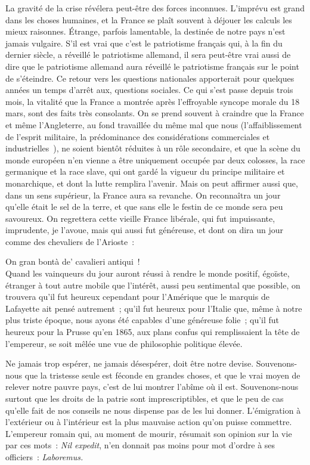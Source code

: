 \documentclass[french,twoside]{book} %
\begin{document}
La gravité de la crise révélera peut-être des forces inconnues. L’imprévu est grand dans les choses humaines, et la France se plaît souvent à déjouer les calculs les mieux raisonnes. Étrange, parfois lamentable, la destinée de notre pays n’est jamais vulgaire. S’il est vrai que c’est le patriotisme français qui, à la fin du dernier siècle, a réveillé le patriotisme allemand, il sera peut-être vrai aussi de dire que le patriotisme allemand aura réveillé le patriotisme français sur le point de s’éteindre. Ce retour vers les questions nationales apporterait pour quelques années un temps d’arrêt aux, questions sociales. Ce qui s’est passe depuis trois mois, la vitalité que la France a montrée après l’effroyable syncope morale du 18 mars, sont des faits très consolants. On se prend souvent à craindre que la France et même l’Angleterre, au fond travaillée du même mal que nous (l’affaiblissement de l’esprit militaire, la prédominance des considérations commerciales et industrielles ), ne soient bientôt réduites à un rôle secondaire, et que la scène du monde européen n’en vienne a être uniquement occupée par deux colosses, la race germanique et la race slave, qui ont gardé la vigueur du principe militaire et monarchique, et dont la lutte remplira l’avenir. Mais on peut affirmer aussi que, dans un sens supérieur, la France aura sa revanche. On reconnaîtra un jour qu’elle était le sel de la terre, et que sans elle le festin de ce monde sera peu savoureux. On regrettera cette vieille France libérale, qui fut impuissante, imprudente, je l’avoue, mais qui aussi fut généreuse, et dont on dira un jour comme des chevaliers de l’Arioste :\par

On gran bontà de’ cavalieri antiqui !\\

\noindent Quand les vainqueurs du jour auront réussi à rendre le monde positif, égoïste, étranger à tout autre mobile que l’intérêt, aussi peu sentimental que possible, on trouvera qu’il fut heureux cependant pour l’Amérique que le marquis de Lafayette ait pensé autrement ; qu’il fut heureux pour l’Italie que, même à notre plus triste époque, nous ayons été capables d’une généreuse folie ; qu’il fut heureux pour la Prusse qu’en 1865, aux plans confus qui remplissaient la tête de l’empereur, se soit mêlée une vue de philosophie politique élevée.\par
Ne jamais trop espérer, ne jamais désespérer, doit être notre devise. Souvenons-nous que la tristesse seule est féconde en grandes choses, et que le vrai moyen de relever notre pauvre pays, c’est de lui montrer l’abîme où il est. Souvenons-nous surtout que les droits de la patrie sont imprescriptibles, et que le peu de cas qu’elle fait de nos conseils ne nous dispense pas de les lui donner. L’émigration à l’extérieur ou à l’intérieur est la plus mauvaise action qu’on puisse commettre. L’empereur romain qui, au moment de mourir, résumait son opinion sur la vie par ces mots : {\itshape Nil expedit}, n’en donnait pas moins pour mot d’ordre à ses officiers : {\itshape Laboremus.}
 
\end{document}
